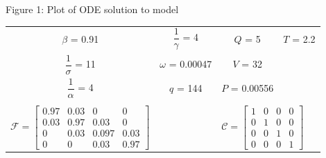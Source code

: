 \documentclass[fleqn]{article}
\begin{document}
\begin{center}
Figure 1: Plot of ODE solution to model
\begin{table}[h]
\begin{tabular}{@{}cccc@{}}
$\beta$ = 0.91                                                                                                                                                     & $\dfrac{1}{\gamma}$ = 4 & $Q$ = 5                                                          & $T$ = 2.2                                                        \\
$\dfrac{1}{\sigma}$ = 11                                                                                                                                            & $\omega$ = 0.00047     & $V$ = 32                                                         &                                                                  \\[0.4cm]
$\dfrac{1}{\alpha}$ = 4                                                                                                                                             & $q$ = 144              & $P$ = 0.00556                                                    &                                                                  \\
\multicolumn{1}{l}{}                                                                                                                                               & \multicolumn{1}{l}{}   & \multicolumn{1}{l}{}                                             & \multicolumn{1}{l}{}                                             \\
\multicolumn{1}{l}{$ \mathcal{F} = \begin{bmatrix} 0.97 & 0.03 & 0 & 0 \\ 0.03 & 0.97 & 0.03 & 0 \\ 0 & 0.03 & 0.097 & 0.03 \\ 0 & 0 & 0.03 & 0.97 \end{bmatrix}$} & \multicolumn{1}{l}{}   & \multicolumn{2}{l}{$ \mathcal{C} = \begin{bmatrix} 1 & 0 & 0 & 0 \\ 0 & 1 & 0 & 0 \\ 0 & 0 & 1 & 0 \\ 0 & 0 & 0 & 1 \end{bmatrix}$}
\end{tabular}
\end{table}

\end{center}
\end{document}
